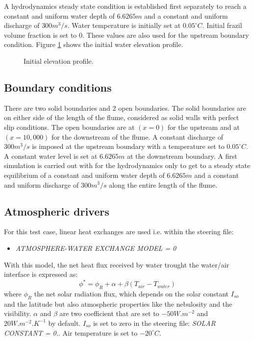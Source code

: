 A hydrodynamics steady state condition is established first separately to reach a constant and uniform water depth of $6.6265m$ and a constant and uniform discharge of $300m^3/s$.
Water temperature is initially set at $0.05^\circ C$. Initial frazil volume fraction is set to $0$. These values are also used for the upstream boundary condition. Figure \ref{fig:prec_profile} shows the initial water elevation profile.

\begin{figure}[H]
    \begin{center}
    \end{center}
    \caption{Initial elevation profile.}
    \label{fig:prec_profile}
\end{figure}

\subsection{Boundary conditions}

There are two solid boundaries and 2 open boundaries.
The solid boundaries are on either side of the length of the flume, considered as solid walls with perfect slip conditions.
The open boundaries are at $(x=0)$ for the upstream and at $(x=10,000)$ for the downstream of the flume. A constant discharge of $300m^3/s$ is imposed at the upstream boundary with a temperature set to $0.05^{\circ} C$. A constant water level is set at $6.6265m$ at the downstream boundary.
A first simulation is carried out with for the hydrodynamics only to get to a steady state equilibrium of a constant and uniform water depth of $6.6265m$ and a constant and uniform discharge of $300m^3/s$ along the entire length of the flume.


\subsection{Atmospheric drivers}

For this test case, linear heat exchanges are used i.e. within the \khione steering file:
\begin{itemize}
	\item\textit{ATMOSPHERE-WATER EXCHANGE MODEL = 0}
\end{itemize}

With this model, the net heat flux received by water trought the water/air interface is expressed as:
\begin{equation}
\phi^* = \phi_R + \alpha + \beta (T_{air} - T_{water})
\end{equation}
where $\phi_R$ the net solar radiation flux, which depends on the solar constant $I_{so}$ and the latitude but
also atmospheric properties like the nebulosity and the visibility. $\alpha$ and $\beta$ are two coefficient that
are set to $-50W.m^{-2}$ and $20W.m^{-2}.K^{-1}$ by default. $I_{so}$ is set to zero in
the \khione steering file: \textit{SOLAR CONSTANT = 0.}.
Air temperature is set to $-20 ^{\circ}C$.

